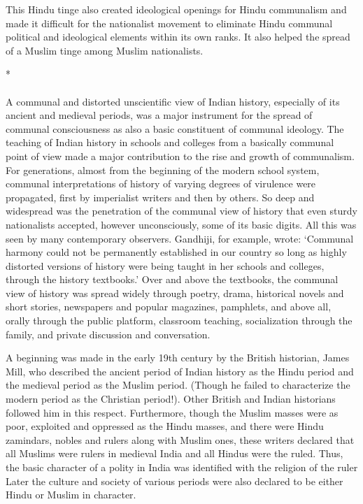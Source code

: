 \begin{multicols}{2}
This Hindu tinge also created ideological openings for Hindu communalism and made it difficult for the nationalist movement to eliminate Hindu communal political and ideological elements within its own ranks. It also helped the spread of a Muslim tinge among Muslim nationalists.

\begin{center}*\end{center}

\paragraph*{}
A communal and distorted unscientific view of Indian history, especially of its ancient and medieval periods, was a major instrument for the spread of communal consciousness as also a basic constituent of communal ideology. The teaching of Indian history in schools and colleges from a basically communal point of view made a major contribution to the rise and growth of communalism. For generations, almost from the beginning of the modern school system, communal interpretations of history of varying degrees of virulence were propagated, first by imperialist writers and then by others. So deep and widespread was the penetration of the communal view of history that even sturdy nationalists accepted, however unconsciously, some of its basic digits. All this was seen by many contemporary observers. Gandhiji, for example, wrote: `Communal harmony could not be permanently established in our country so long as highly distorted versions of history were being taught in her schools and colleges, through the history textbooks.' Over and above the textbooks, the communal view of history was spread widely through poetry, drama, historical novels and short stories, newspapers and popular magazines, pamphlets, and above all, orally through the public platform, classroom teaching, socialization through the family, and private discussion and conversation.

A beginning was made in the early 19th century by the British historian, James Mill, who described the ancient period of Indian history as the Hindu period and the medieval period as the Muslim period. (Though he failed to characterize the modern period as the Christian period!). Other British and Indian historians followed him in this respect. Furthermore, though the Muslim masses were as poor, exploited and oppressed as the Hindu masses, and there were Hindu zamindars, nobles and rulers along with Muslim ones, these writers declared that all Muslims were rulers in medieval India and all Hindus were the ruled. Thus, the basic character of a polity in India was identified with the religion of the ruler Later the culture and society of various periods were also declared to be either Hindu or Muslim in character.


\end{multicols}
